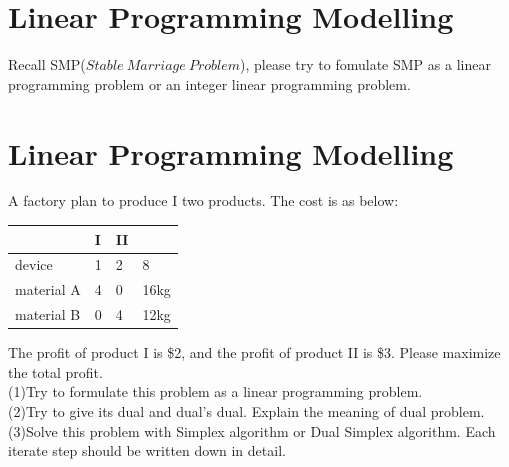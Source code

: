 \documentclass[a4paper,11pt]{article}
\begin{document}
\section{Linear Programming Modelling}
Recall SMP($Stable\ Marriage\ Problem$), please try to fomulate SMP as a linear programming problem or an integer linear programming problem.

\section{Linear Programming Modelling}
A factory plan to produce I \uppercase\expandafter{} two products. The cost is as below:
\begin{center}
\begin{tabular}{p{2.5cm}|p{2.5cm}|p{2.5cm}|p{2.5cm}}
\hline 
 & I& II & \\
\hline
device & 1 & 2 &  8 \\ \hline
material A & 4 & 0 & 16kg\\ \hline
material B & 0 & 4 & 12kg\\ \hline 
\end{tabular}
\end{center}
The profit of product I is \$2, and the profit of product II is \$3. Please maximize the total profit.\\
(1)Try to formulate this problem as a linear programming problem.\\
(2)Try to give its dual and dual's dual. Explain the meaning of dual problem.\\
(3)Solve this problem with Simplex algorithm or Dual Simplex algorithm. Each iterate step should be written down in detail.\\
\end{document}
